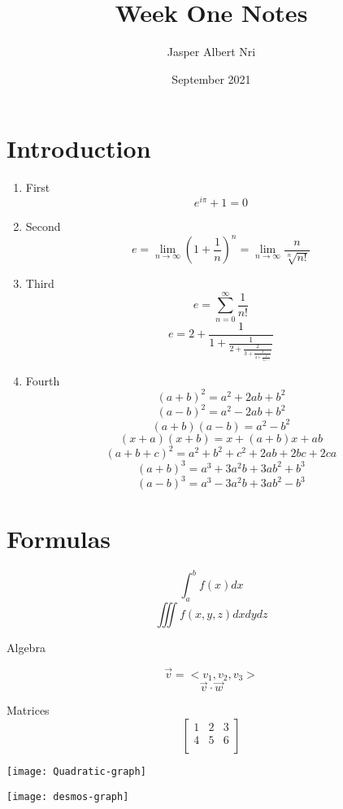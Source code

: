 \documentclass{article}
\title{Week One Notes}
\author{Jasper Albert Nri}
\date{September 2021}
\begin{document}
\maketitle

\section*{Introduction}
\begin{enumerate}
    \item First
    $$e^{i\pi}+1=0$$
    
    \item Second
    $$e = \lim_{n\to\infty}\left(1+\frac{1}{n}\right)^n = \lim_{n\to\infty}\frac{n}{\sqrt[n]{n!}}$$ 
    
    \item Third
    $$ e = \sum_{n=0}^{\infty} \frac{1}{n!} $$
    $$ e = 2+\frac{1}{1+\frac{1}{2+\frac{2}{3+\frac{3}{4+\frac{4}{5+\ddots}}}}}$$
    
    \item Fourth
    $${(a+b)^2 = a^2 +2ab + b^2}$$
    $${(a-b)^2 = a^2 - 2ab + b^2}$$
    $${(a+b)(a-b) = a^2 -  b^2}$$
    $${(x+a)(x+b) = x + (a+b)x + ab}$$
    $${(a+b+c)^2 = a^2+b^2+c^2+2ab+2bc+2ca}$$
    $${(a+b)^3 = a^3 + 3a^2b + 3ab^2 +b^3}$$
    $${(a-b)^3 = a^3 - 3a^2b + 3ab^2 -b^3}$$
    
\end{enumerate}
\section*{Formulas}
$$\int_a^bf(x)dx$$
$$\iiint f(x,y,z)dxdydz$$

Algebra

$$\vec{v}=<v_1, v_2, v_3>$$
$$\vec{v}\cdot \vec{w}$$

Matrices
$$
\begin{bmatrix}
1 & 2 & 3\\
4 & 5 & 6\\
\end{bmatrix}$$


\texttt{[image: Quadratic-graph]}

\texttt{[image: desmos-graph]}
\end{document}
